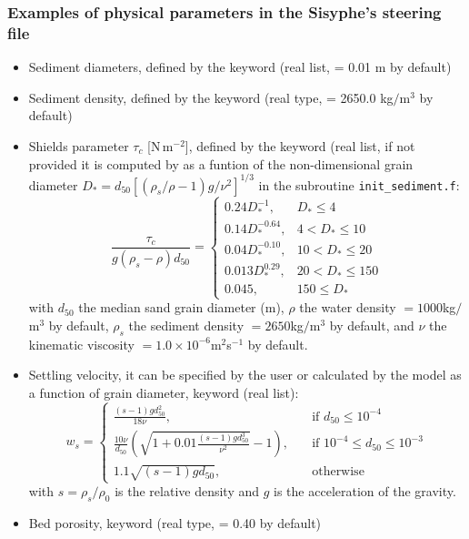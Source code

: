 {\subsubsection{Examples of physical parameters in the Sisyphe's steering file}
\begin{itemize}
\item Sediment diameters, defined by the keyword  (real list, {\ttfamily = 0.01} m by default)
\item Sediment density, defined by the keyword  (real type, {\ttfamily = 2650.0} kg$/$m$^3$ by default)
\item Shields parameter $\tau_c$ [N\,m$^{-2}$], defined by the keyword  (real list, if not provided it is computed by \sisyphe{} as a funtion of the non-dimensional grain diameter $D_*=d_{50}[(\rho_s/\rho-1)g/\nu^2]^{1/3}$ in the subroutine \texttt{init\_sediment.f}:
\begin{equation*}
\frac{\tau_c}{g(\rho_s -\rho)d_{50}}=\left\{\begin{array}{ll}
0.24 D_*^{-1}, & D_* \leq 4 \\
0.14 D_*^{-0.64}, & 4 < D_* \leq 10 \\
 0.04 D_*^{-0.10}, & 10 < D_* \leq 20\\
0.013 D_*^{0.29}, & 20 < D_* \leq 150 \\
0.045, & 150 \leq D_* 
\end{array}
\right.
\end{equation*}
with $d_{50}$ the median sand grain diameter (m), $\rho$ the water density $=1000$kg$/$m$^3$ by default, $\rho_s$ the sediment density $=2650$kg$/$m$^3$ by default, and $\nu$ the kinematic viscosity $=1.0\times 10^{-6}$m$^2$s$^{-1}$ by default.  
  
\item Settling velocity, it can be specified by the user or calculated by the model as a function of grain diameter, keyword  (real list):
  \begin{equation*}
w_{s} = \left\{\begin{array}{ll}
\displaystyle
\frac{(s-1)g d_{50}^2}{18\nu}, & \quad \text{if } d_{50} \leq 10^{-4} \\
\displaystyle
\frac{10\nu}{d_{50}} \left(\sqrt{1+0.01\frac{(s-1)gd_{50}^3}{\nu^2}}-1\right), & \quad \text{if } 10^{-4} \leq d_{50} \leq 10^{-3}\\ 
\displaystyle
1.1 \sqrt{(s-1)gd_{50}}, & \quad \text{otherwise} 
\end{array}
\right.
\end{equation*}
with $s=\rho_{s}/\rho_0$ is the relative density and $g$ is the acceleration of the gravity.%
\item Bed porosity, keyword  (real type, {\ttfamily = 0.40} by default)  
\end{itemize}



}
